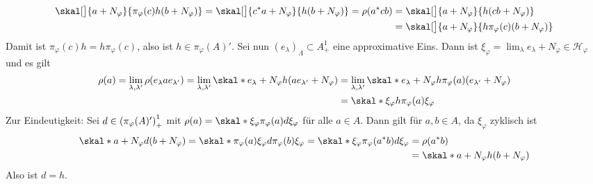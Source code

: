 \begin{beweis}
\begin{align}
		\skal[\big]{a + N_\varphi}{\pi_\varphi(c)h (b+N_\varphi)} = \skal[\big]{c^*a + N_\varphi}{h(b+N_\varphi)} = \rho \enbrace*{a^*cb} &= \skal[\big]{a + N_\varphi}{h(cb+N_\varphi)} \\
		&= \skal[\big]{a+ N_\varphi}{h \pi_\varphi(c)(b+ N_\varphi)}
	\end{align}
	Damit ist $\pi_\varphi(c) h = h \pi_\varphi(c)$, also ist $h \in \pi_\varphi(A)'$.
	Sei nun $(e_\lambda)_\Lambda \subset A^1_+$ eine approximative Eins. Dann ist $\xi_\varphi = \lim_\lambda e_\lambda+ N_\varphi \in \mathcal{H}_\varphi$ und es gilt
	\begin{align}
		\rho(a)= \lim_{\lambda,\lambda'} \rho \enbrace*{e_\lambda a e_{\lambda'}}= \lim_{\lambda,\lambda'} \skal*{e_\lambda + N_\varphi}{h(a e_{\lambda'}+ N_\varphi)}
		&= \lim_{\lambda,\lambda'} \skal*{e_\lambda+ N_\varphi}{h \pi_\varphi(a) (e_{\lambda'} + N_\varphi)} \\
		&= \skal*{\xi_\varphi}{h \pi_\varphi(a)\xi_\varphi}
	\end{align}
	Zur Eindeutigkeit: Sei $d \in \enbrace*{\pi_\varphi(A)'}^1_+$ mit $\rho(a)= \skal*{\xi_\varphi}{\pi_\varphi(a)d \xi_\varphi}$ für alle $a \in A$.
	Dann gilt für $a,b \in A$, da $\xi_\varphi$ zyklisch ist
	\begin{align}
		\skal*{a+ N_\varphi}{d(b+N_\varphi)} = \skal*{\pi_\varphi(a) \xi_\varphi}{d \pi_\varphi(b) \xi_\varphi} = \skal*{\xi_\varphi}{\pi_\varphi(a^*b)d \xi_\varphi} 
		&= \rho(a^*b) \\ &= \skal*{a+ N_\varphi}{h(b+N_\varphi)}
	\end{align}
	Also ist $d=h$.
\end{beweis}

